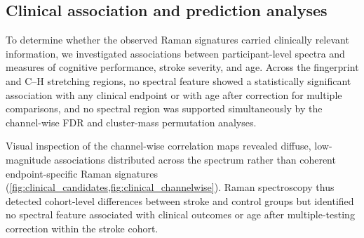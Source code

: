 \documentclass[preprint,12pt]{elsarticle}
\begin{document}
\subsection{Clinical association and prediction analyses} \label{subsec:clinical_results}

To determine whether the observed Raman signatures carried clinically relevant information, we investigated associations between participant-level spectra and measures of cognitive performance, stroke severity, and age. Across the fingerprint and C--H stretching regions, no spectral feature showed a statistically significant association with any clinical endpoint or with age after correction for multiple comparisons, and no spectral region was supported simultaneously by the channel-wise FDR and cluster-mass permutation analyses.

Visual inspection of the channel-wise correlation maps revealed diffuse, low-magnitude associations distributed across the spectrum rather than coherent endpoint-specific Raman signatures (\cref{fig:clinical_candidates,fig:clinical_channelwise}). Raman spectroscopy thus detected cohort-level differences between stroke and control groups but identified no spectral feature associated with clinical outcomes or age after multiple-testing correction within the stroke cohort.
\end{document}
